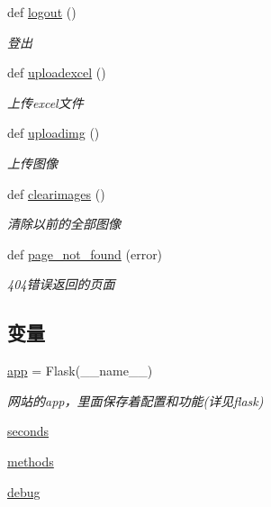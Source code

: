 \begin{DoxyCompactItemize}
def \mbox{\hyperlink{group___xE8_xB7_xAF_xE7_x94_xB1_xE5_x87_xBD_xE6_x95_xB0_ga6065500a38cb05f19a9613bdc7ac05f1}{logout}} ()
\begin{DoxyCompactList}\small\item\em 登出 \end{DoxyCompactList}\item 
def \mbox{\hyperlink{group___xE8_xB7_xAF_xE7_x94_xB1_xE5_x87_xBD_xE6_x95_xB0_gadc4862ff2e8d5f1dee064a0b2f9f3dc9}{uploadexcel}} ()
\begin{DoxyCompactList}\small\item\em 上传excel文件 \end{DoxyCompactList}\item 
def \mbox{\hyperlink{group___xE8_xB7_xAF_xE7_x94_xB1_xE5_x87_xBD_xE6_x95_xB0_gad28764d44d01ada36ff0dfbbcac903d5}{uploadimg}} ()
\begin{DoxyCompactList}\small\item\em 上传图像 \end{DoxyCompactList}\item 
def \mbox{\hyperlink{group___xE8_xB7_xAF_xE7_x94_xB1_xE5_x87_xBD_xE6_x95_xB0_gaf30661faaa34905b65c282bff34ede37}{clearimages}} ()
\begin{DoxyCompactList}\small\item\em 清除以前的全部图像 \end{DoxyCompactList}\item 
def \mbox{\hyperlink{group___xE8_xB7_xAF_xE7_x94_xB1_xE5_x87_xBD_xE6_x95_xB0_ga965cff435fee73194b14e9a6a7f3f2b8}{page\+\_\+not\+\_\+found}} (error)
\begin{DoxyCompactList}\small\item\em 404错误返回的页面 \end{DoxyCompactList}\end{DoxyCompactItemize}
\subsection*{变量}
\begin{DoxyCompactItemize}
\item 
\mbox{\hyperlink{namespacemain_a03b6adcdf574a0b20c970691677129e0}{app}} = Flask(\+\_\+\+\_\+name\+\_\+\+\_\+)
\begin{DoxyCompactList}\small\item\em 网站的app，里面保存着配置和功能(详见flask) \end{DoxyCompactList}\item 
\mbox{\hyperlink{namespacemain_a7ef04f98330fea890d64128141b0c6be}{seconds}}
\item 
\mbox{\hyperlink{group___xE8_xB7_xAF_xE7_x94_xB1_xE5_x87_xBD_xE6_x95_xB0_gad0a71fa7b4080e971323a6c3b1c16331}{methods}}
\item 
\mbox{\hyperlink{namespacemain_a800974c07a8e7de9888fff8cd98a827e}{debug}}
\end{DoxyCompactItemize}


